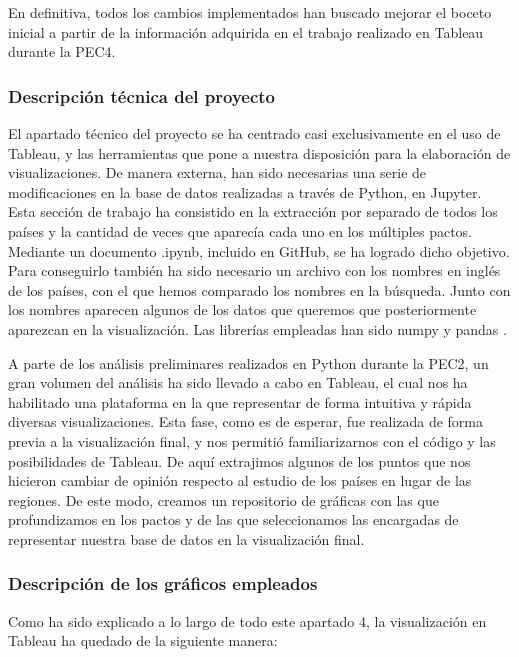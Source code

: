 \documentclass[11pt]{article}
\begin{document}
En definitiva, todos los cambios implementados han buscado mejorar el boceto inicial a partir de la información adquirida en el trabajo realizado en Tableau durante la PEC4.

\subsubsection{Descripción técnica del proyecto}

El apartado técnico del proyecto se ha centrado casi exclusivamente en el uso de Tableau, y las herramientas que pone a nuestra disposición para la elaboración de visualizaciones. De manera externa, han sido necesarias una serie de modificaciones en la base de datos realizadas a través de Python, en Jupyter. Esta sección de trabajo ha consistido en la extracción por separado de todos los países y la cantidad de veces que aparecía cada uno en los múltiples pactos. Mediante un documento .ipynb, incluido en GitHub, se ha logrado dicho objetivo. Para conseguirlo también ha sido necesario un archivo con los nombres en inglés de los países, con el que hemos comparado los nombres en la búsqueda. Junto con los nombres aparecen algunos de los datos que queremos que posteriormente aparezcan en la visualización. Las librerías empleadas han sido numpy \cite{python} y pandas \cite{pandas}.

A parte de los análisis preliminares realizados en Python durante la PEC2, un gran volumen del análisis ha sido llevado a cabo en Tableau, el cual nos ha habilitado una plataforma en la que representar de forma intuitiva y rápida diversas visualizaciones. Esta fase, como es de esperar, fue realizada de forma previa a la visualización final, y nos permitió familiarizarnos con el código y las posibilidades de Tableau. De aquí extrajimos algunos de los puntos que nos hicieron cambiar de opinión respecto al estudio de los países en lugar de las regiones. De este modo, creamos un repositorio de gráficas con las que profundizamos en los pactos y de las que seleccionamos las encargadas de representar nuestra base de datos en la visualización final.

\subsubsection{Descripción de los gráficos empleados}

Como ha sido explicado a lo largo de todo este apartado 4, la visualización en Tableau ha quedado de la siguiente manera:
\end{document}
